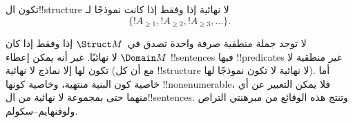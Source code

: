 \documentclass[../../../include/open-logic-section]{subfiles}
\begin{document}
\begin{prop}
تكون ال!!{structure} لا نهائية إذا وفقط إذا كانت نموذجًا لـ
\[
\{!A_{\ge 1}, !A_{\ge 2}, !A_{\ge 3}, \dots \}.
\]
\end{prop}

لا توجد جملة منطقية صرفة واحدة تصدق في~$\Struct M$ إذا وفقط إذا كان
$\Domain M$ لا نهائيًا. غير أنه يمكن إعطاء !!{sentence}s فيها
!!{predicate}s غير منطقية لا تكون لها إلا نماذج لا نهائية (مع أن كل
!!{structure} لا نهائية لا تكون نموذجًا لها). أما خاصية كون البنية
منتهية، وخاصية كونها !!{nonenumerable}، فلا يمكن التعبير عن أي منهما
حتى بمجموعة لا نهائية من ال!!{sentence}s. وتنتج هذه الوقائع من
مبرهنتي التراص ولوفنهايم--سكولم.
\end{document}
